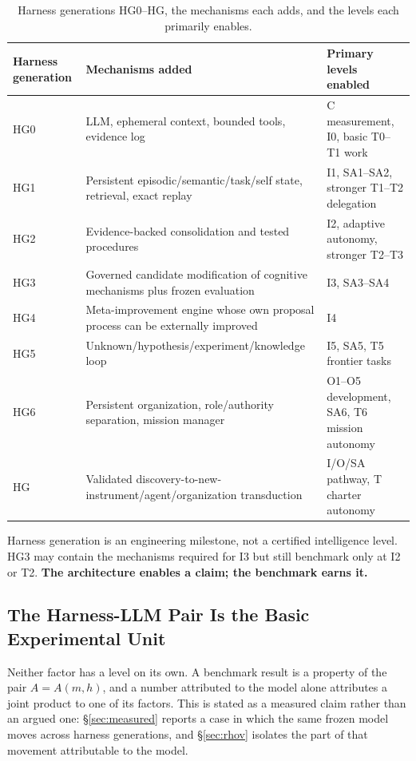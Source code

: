 \begin{table}[!htbp]
\centering\small
\begin{tabularx}{\textwidth}{@{}lYY@{}}
\toprule
Harness generation & Mechanisms added & Primary levels enabled \\
\midrule
HG0 & LLM, ephemeral context, bounded tools, evidence log & C measurement, I0, basic T0--T1 work \\
HG1 & Persistent episodic/semantic/task/self state, retrieval, exact replay & I1, SA1--SA2, stronger T1--T2 delegation \\
HG2 & Evidence-backed consolidation and tested procedures & I2, adaptive autonomy, stronger T2--T3 \\
HG3 & Governed candidate modification of cognitive mechanisms plus frozen evaluation & I3, SA3--SA4 \\
HG4 & Meta-improvement engine whose own proposal process can be externally improved & I4 \\
HG5 & Unknown/hypothesis/experiment/knowledge loop & I5, SA5, T5 frontier tasks \\
HG6 & Persistent organization, role/authority separation, mission manager & O1--O5 development, SA6, T6 mission autonomy \\
HG\Om{} & Validated discovery-to-new-instrument/agent/organization transduction & I\Om{}/O\Om{}/SA\Om{} pathway, T\Om{} charter autonomy \\
\bottomrule
\end{tabularx}
\caption{Harness generations HG0--HG\Om{}, the mechanisms each adds, and the levels each primarily enables.}
\label{tab:hg}
\end{table}

Harness generation is an engineering milestone, not a certified intelligence level. HG3 may contain the mechanisms required for I3 but still benchmark only at I2 or T2. \textbf{The architecture enables a claim; the benchmark earns it.}

\subsection{The Harness-LLM Pair Is the Basic Experimental Unit}\label{sec:pair}

Neither factor has a level on its own. A benchmark result is a property of the pair $A = A(m,h)$, and a number attributed to the model alone attributes a joint product to one of its factors. This is stated as a measured claim rather than an argued one: \S\ref{sec:measured} reports a case in which the same frozen model moves across harness generations, and \S\ref{sec:rhov} isolates the part of that movement attributable to the model.

